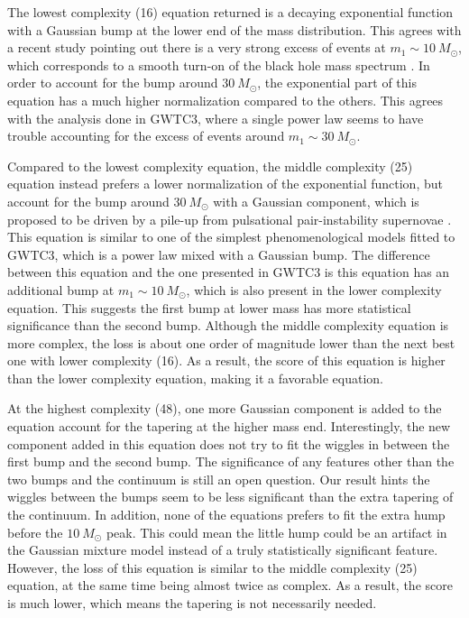 \documentclass[nohyperref]{article}
\theoremstyle{plain}
\theoremstyle{definition}
\theoremstyle{remark}
\begin{document}
The lowest complexity (16) equation returned is a decaying exponential function with a Gaussian bump at the lower end of the mass distribution.
This agrees with a recent study pointing out there is a very strong excess of events at $m_{1}\sim 10\ M_{\odot}$,
which corresponds to a smooth turn-on of the black hole mass spectrum \cite{Talbot:2018cva}.
In order to account for the bump around $30\ M_{\odot}$,
the exponential part of this equation has a much higher normalization compared to the others.
This agrees with the analysis done in GWTC3, where a single power law seems to have trouble accounting for the excess of events around $m_{1}\sim 30\ M_{\odot}$\cite{LIGOScientific:2021psn}.

Compared to the lowest complexity equation, the middle complexity (25) equation instead prefers a lower normalization of the exponential function,
but account for the bump around $30\ M_{\odot}$ with a Gaussian component,
which is proposed to be driven by a pile-up from pulsational pair-instability supernovae \cite{Talbot:2018cva}.
This equation is similar to one of the simplest phenomenological models fitted to GWTC3, which is a power law mixed with a Gaussian bump.
The difference between this equation and the one presented in GWTC3 is this equation has an additional bump at $m_{1}\sim 10\ M_{\odot}$,
which is also present in the lower complexity equation.
This suggests the first bump at lower mass has more statistical significance than the second bump.
Although the middle complexity equation is more complex, the loss is about one order of magnitude lower than the next best one with lower complexity (16).
As a result, the score of this equation is higher than the lower complexity equation, making it a favorable equation.

At the highest complexity (48), one more Gaussian component is added to the equation account for the tapering at the higher mass end. 
Interestingly, the new component added in this equation does not try to fit the wiggles in between the first bump and the second bump.
The significance of any features other than the two bumps and the continuum is still an open question.
Our result hints the wiggles between the bumps seem to be less significant than the extra tapering of the continuum.
In addition, none of the equations prefers to fit the extra hump before the $10\ M_{\odot}$ peak.
This could mean the little hump could be an artifact in the Gaussian mixture model instead of a truly statistically significant feature.
However, the loss of this equation is similar to the middle complexity (25) equation, at the same time being almost twice as complex. As a result, the score is much lower, which means the tapering is not necessarily needed.
\end{document}
